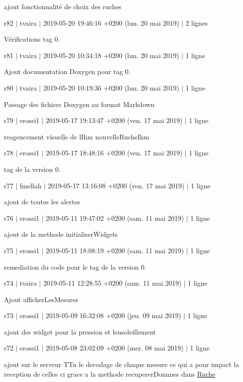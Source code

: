 ajout fonctionnalité de choix des ruches

r82 $\vert$ tvaira $\vert$ 2019-\/05-\/20 19\+:46\+:16 +0200 (lun. 20 mai 2019) $\vert$ 2 lignes

Vérifications tag 0.

r81 $\vert$ tvaira $\vert$ 2019-\/05-\/20 10\+:34\+:18 +0200 (lun. 20 mai 2019) $\vert$ 1 ligne

Ajout documentation Doxygen pour tag 0.

r80 $\vert$ tvaira $\vert$ 2019-\/05-\/20 10\+:19\+:36 +0200 (lun. 20 mai 2019) $\vert$ 1 ligne

Passage des fichiers Doxygen au format Markdown

r79 $\vert$ erossi1 $\vert$ 2019-\/05-\/17 19\+:13\+:47 +0200 (ven. 17 mai 2019) $\vert$ 1 ligne

reagencement visuelle de l\textquotesingle{}Ihm nouvelle\+Ruche\+Ihm

r78 $\vert$ erossi1 $\vert$ 2019-\/05-\/17 18\+:48\+:16 +0200 (ven. 17 mai 2019) $\vert$ 1 ligne

tag de la version 0.

r77 $\vert$ fmellah $\vert$ 2019-\/05-\/17 13\+:16\+:08 +0200 (ven. 17 mai 2019) $\vert$ 1 ligne

ajout de toutes les alertes

r76 $\vert$ erossi1 $\vert$ 2019-\/05-\/11 19\+:47\+:02 +0200 (sam. 11 mai 2019) $\vert$ 1 ligne

ajout de la methode initialiser\+Widgets

r75 $\vert$ erossi1 $\vert$ 2019-\/05-\/11 18\+:08\+:19 +0200 (sam. 11 mai 2019) $\vert$ 1 ligne

remediation du code pour le tag de la version 0.

r74 $\vert$ tvaira $\vert$ 2019-\/05-\/11 12\+:28\+:55 +0200 (sam. 11 mai 2019) $\vert$ 1 ligne

Ajout afficher\+Les\+Mesures

r73 $\vert$ erossi1 $\vert$ 2019-\/05-\/09 16\+:32\+:08 +0200 (jeu. 09 mai 2019) $\vert$ 1 ligne

ajout des widget pour la pression et l\textquotesingle{}ensoleillement

r72 $\vert$ erossi1 $\vert$ 2019-\/05-\/08 23\+:02\+:09 +0200 (mer. 08 mai 2019) $\vert$ 1 ligne

ajout sur le serveur T\+Tn le decodage de chaque mesure ce qui a pour impact la reception de celles ci grace a la methode recuperer\+Donnnes dans \hyperlink{class_ruche}{Ruche}

